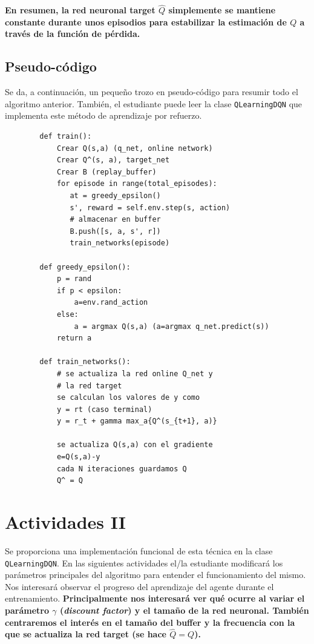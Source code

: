 \documentclass{article}
\begin{document}
\textbf{En resumen, la red neuronal target $\hat{Q}$ simplemente se mantiene constante durante unos episodios para estabilizar la estimación de $Q$ a través de la función de pérdida.}

\subsection{Pseudo-código}
Se da, a continuación, un pequeño trozo en pseudo-código para resumir todo el algoritmo anterior. También, el estudiante puede leer la clase \texttt{QLearningDQN} que implementa este método de aprendizaje por refuerzo.

\begin{small}
    \begin{verbatim}
        def train():
            Crear Q(s,a) (q_net, online network)
            Crear Q^(s, a), target_net
            Crear B (replay_buffer)
            for episode in range(total_episodes):
               at = greedy_epsilon()
               s', reward = self.env.step(s, action)
               # almacenar en buffer
               B.push([s, a, s', r])
               train_networks(episode)
               
        def greedy_epsilon():
            p = rand
            if p < epsilon:
                a=env.rand_action
            else:
                a = argmax Q(s,a) (a=argmax q_net.predict(s))
            return a
            
        def train_networks():
            # se actualiza la red online Q_net y
            # la red target
            se calculan los valores de y como
            y = rt (caso terminal)
            y = r_t + gamma max_a{Q^(s_{t+1}, a)}

            se actualiza Q(s,a) con el gradiente
            e=Q(s,a)-y
            cada N iteraciones guardamos Q
            Q^ = Q
    \end{verbatim}    
\end{small}

\section{Actividades II}
Se proporciona una implementación funcional de esta técnica en la clase \texttt{QLearningDQN}. En las siguientes actividades el/la estudiante modificará los parámetros principales del algoritmo para entender el funcionamiento del mismo. Nos interesará observar el progreso del aprendizaje del agente durante el entrenamiento. \textbf{Principalmente nos interesará ver qué ocurre al variar el parámetro $\gamma$ (\textit{discount factor}) y el tamaño de la red neuronal. También centraremos el interés en el tamaño del buffer y la frecuencia con la que se actualiza la red target (se hace $\hat{Q}=Q$).}
\end{document}
